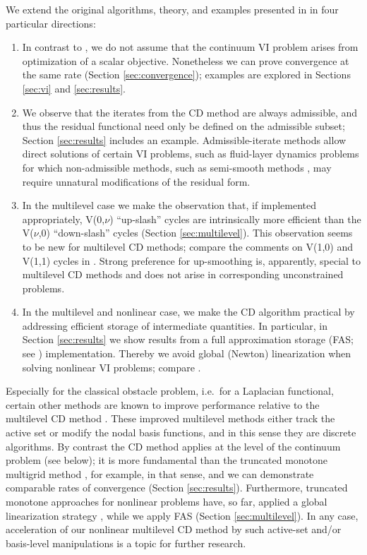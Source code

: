 \documentclass[letterpaper,final,12pt,reqno]{amsart}
\theoremstyle{cstyle}
\theoremstyle{dstyle}
\numberwithin{equation}{section}
\numberwithin{figure}{section}
\numberwithin{table}{section}
\numberwithin{theorem}{section}
\begin{document}
We extend the original algorithms, theory, and examples presented in \cite{Tai2003} in four particular directions:
\renewcommand{\labelenumi}{\emph{(\roman{enumi})}}
\begin{enumerate}
\item In contrast to \cite{Tai2003}, we do not assume that the continuum VI problem arises from optimization of a scalar objective.  Nonetheless we can prove convergence at the same rate (Section \ref{sec:convergence}); %
examples are explored in Sections \ref{sec:vi} and \ref{sec:results}.
\item We observe that the iterates from the CD method are always admissible, and thus the residual functional need only be defined on the admissible subset; Section \ref{sec:results} includes an example.  Admissible-iterate methods allow direct solutions of certain VI problems, such as fluid-layer dynamics problems \cite{Bueler2021conservation,JouvetBueler2012} for which non-admissible methods, such as semi-smooth methods \cite{BensonMunson2006}, may require unnatural modifications of the residual form.
\item In the multilevel case we make the observation that, if implemented appropriately, V(0,$\nu$) ``up-slash'' cycles are intrinsically more efficient than the V($\nu$,0) ``down-slash'' cycles (Section \ref{sec:multilevel}).  This observation seems to be new for multilevel CD methods; compare the comments on V(1,0) and V(1,1) cycles in \cite{GraeserKornhuber2009,Tai2003}.  Strong preference for up-smoothing is, apparently, special to multilevel CD methods and does not arise in corresponding unconstrained problems.
\item In the multilevel and nonlinear case, we make the CD algorithm practical by addressing efficient storage of intermediate quantities.  In particular, in Section \ref{sec:results} we show results from a full approximation storage (FAS; see \cite{Brandt1977}) implementation.  Thereby we avoid global (Newton) linearization when solving nonlinear VI problems; compare \cite{GraeserKornhuber2009}.
\end{enumerate}

Especially for the classical obstacle problem, i.e.~for a Laplacian functional, certain other methods are known to improve performance relative to the multilevel CD method \cite{GraeserKornhuber2009}.  These improved multilevel methods either track the active set or modify the nodal basis functions, and in this sense they are discrete algorithms.  By contrast the CD method applies at the level of the continuum problem (see below); it is more fundamental than the truncated monotone multigrid method \cite{Kornhuber1994}, for example, in that sense, and we can demonstrate comparable rates of convergence (Section \ref{sec:results}). %
Furthermore, truncated monotone approaches for nonlinear problems have, so far, applied a global linearization strategy \cite{GraeserKornhuber2009}, while we apply FAS (Section \ref{sec:multilevel}).  In any case, acceleration of our nonlinear multilevel CD method by such active-set and/or basis-level manipulations is a topic for further research.
\end{document}
